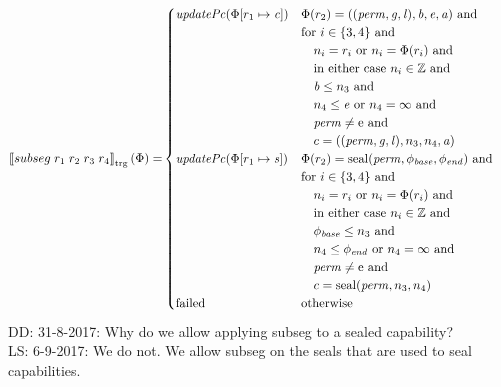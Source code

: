 \documentclass[a4paper]{article}
\newcommand\lau[1]{{\color{purple} \sf \footnotesize {LS: #1}}\\}
\newcommand\dominique[1]{{\color{purple} \sf \footnotesize {DD: #1}}\\}
\newcommand{\sem}[1]{\left\llbracket #1 \right\rrbracket}
\newcommand{\tsem}[2][\Phi]{\sem{#2}_{\mathrm{trg}}(#1)}
\newcommand{\tand}{\text{ and }}
\newcommand{\totherwise}{\text{otherwise }}
\newcommand{\targetcolor}[1]{\color{black}}
\newcommand{\trg}[1]{{\targetcolor{} #1}}
\newcommand{\zinstr}[1]{#1}
\newcommand{\fourinstr}[5]{
  \ifthenelse{\equal{#2#3#4#5}{}}
  {\zinstr{#1}}
  {\zinstr{#1} \; #2 \; #3 \; #4 \; #5}
}
\newcommand{\tsubseg}[4]{\fourinstr{\trg{subseg}}{#1}{#2}{#3}{#4}}
\newcommand{\ints}{\mathbb{Z}}
\newcommand{\update}[2]{[#1 \mapsto #2]}
\newcommand{\shareddom}[1]{\mathrm{#1}}
\newcommand{\perm}{\var{perm}}
\newcommand{\gl}{\var{g}}
\newcommand{\lin}{\var{l}}
\newcommand{\seal}[1]{\shareddom{seal}(#1)}
\newcommand{\failed}{\mathrm{failed}}
\newcommand{\var}[1]{\mathit{#1}}
\newcommand{\baddr}{\var{b}}
\newcommand{\eaddr}{\var{e}}
\newcommand{\aaddr}{\var{a}}
\newcommand{\plainperm}[1]{\mathrm{#1}}
\newcommand{\enter}{\plainperm{e}}
\newcommand{\plainfun}[2]{
  \ifthenelse{\equal{#2}{}}
  {\mathit{#1}}
  {\mathit{#1}(#2)}
}
\newcommand{\updPcAddr}[1]{\plainfun{updatePc}{#1}}
\begin{document}
\begin{align*}
  \tsem{\tsubseg{r_1}{r_2}{r_3}{r_4}} = &
                                     \begin{cases}
                                       \updPcAddr{\Phi\update{r_1}{\var{c}}} &
                                       \arraycolsep=0pt
                                       \begin{array}[t]{l}
                                         \Phi(r_2) = ((\perm,\gl,\lin),\baddr, \eaddr, \aaddr) \tand \\
                                         \text{for $i \in \{3,4\}$ and} \\
                                         \quad n_i = r_i \text{ or } n_i = \Phi(r_i) \tand \\
                                         \quad \text{in either case $n_i \in \ints$ and} \\
                                         \quad \baddr \leq n_3 \tand \\
                                         \quad n_4 \leq \eaddr \text{ or } n_4 = \infty \tand \\
                                         \quad \perm \neq \enter \tand \\
                                         \quad c = ((\perm,\gl,\lin),n_3,n_4,\aaddr)
                                       \end{array} \\
                                       \updPcAddr{\Phi\update{r_1}{\var{s}}} &
                                       \arraycolsep=0pt
                                       \begin{array}[t]{l}
                                         \Phi(r_2) = \seal{\perm,\phi_{\var{base}},\phi_{\var{end}}} \tand \\
                                         \text{for $i \in \{3,4\}$ and} \\
                                         \quad n_i = r_i \text{ or } n_i = \Phi(r_i) \tand \\
                                         \quad \text{in either case $n_i \in \ints$ and} \\
                                         \quad \phi_{\var{base}} \leq n_3 \tand \\
                                         \quad n_4 \leq \phi_{\var{end}} \text{ or } n_4 = \infty \tand \\
                                         \quad \perm \neq \enter \tand \\
                                         \quad c = \seal{\perm, n_3,n_4}
                                       \end{array} \\
                                       \failed & \totherwise
                                     \end{cases}
\end{align*}
\dominique{31-8-2017: Why do we allow applying subseg to a sealed capability?}
\lau{6-9-2017: We do not. We allow subseg on the seals that are used to seal capabilities.}
\end{document}
